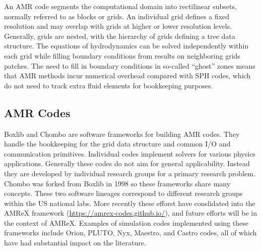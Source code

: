 \documentclass[11pt,twoside]{article}
\begin{document}
An AMR code segments the computational domain into rectilinear subsets, normally referred to as blocks or grids. An individual grid defines a fixed resolution and may overlap with grids at higher or lower resolution levels. Generally, grids are nested, with the hierarchy of grids defining a tree data structure. The equations of hydrodynamics can be solved independently within each grid while filling boundary conditions from results on neighboring grids patches. The need to fill in boundary conditions in so-called ``ghost'' zones means that AMR methods incur numerical overhead compared with SPH codes, which do not need to track extra fluid elements for bookkeeping purposes.

\subsection{AMR Codes}

Boxlib \citep{zhang2016} and Chombo \citep{adams2015} are software frameworks for building AMR codes. They handle the bookkeeping for the grid data structure and common I/O and communication primitives. Individual codes implement solvers for various physics applications. Generally these codes do not aim for general applicability. Instead they are developed by individual research groups for a primary research problem. Chombo was forked from Boxlib in 1998 so these frameworks share many concepts. These two software lineages correspond to different research groups within the US national labs. More recently these efforst have conslidated into the AMReX framework (\url{https://amrex-codes.github.io/}), and future efforts will be in the context of AMReX. Examples of simulation codes implemented using these frameworks include Orion, PLUTO, Nyx, Maestro, and Castro codes, all of which have had substantial impact on the literature.
\end{document}
